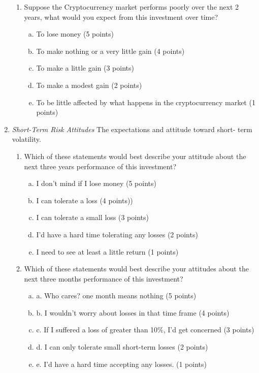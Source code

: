 \documentclass[	DIV=calc,%
							paper=letter,%
							fontsize=12pt%
                            ]{scrartcl}	 					%
\begin{document}
\begin{enumerate}[-]
\begin{enumerate}[1.]
    \item Suppose the Cryptocurrency market performs poorly over the next 2 years, what would you expect from this investment over time?
    \begin{enumerate}[a)]
      \item To lose money (5 points) 
      \item To make nothing or a very little gain (4 points)
      \item To make a little gain (3 points)
      \item To make a modest gain (2 points)
      \item To be little affected by what happens in the cryptocurrency market (1 points) 
    \end{enumerate}
  \end{enumerate}
  
    \item \textit{Short-Term Risk Attitudes} The expectations and attitude toward short- term volatility.
  \begin{enumerate}[1.]
    \item Which of these statements would best describe your attitude about the next three years performance of this investment?
    \begin{enumerate}[a)]
      \item I don’t mind if I lose money (5 points)
      \item I can tolerate a loss (4 points))
      \item I can tolerate a small loss (3 points)
      \item I’d have a hard time tolerating any losses (2 points)
      \item I need to see at least a little return (1 points) 
    \end{enumerate}
    \item Which of these statements would best describe your attitudes about the next three months performance of this investment?
    \begin{enumerate}[a)]
      \item a.	Who cares? one month means nothing (5 points) 
      \item b.	I wouldn't worry about losses in that time frame (4 points)
      \item c.	If I suffered a loss of greater than 10\%, I’d get concerned (3 points)
      \item d.	I can only tolerate small short-term losses (2 points)
      \item e.	I’d have a hard time accepting any losses. (1 points) 
    \end{enumerate}
  \end{enumerate}
\end{enumerate}
\end{document}
